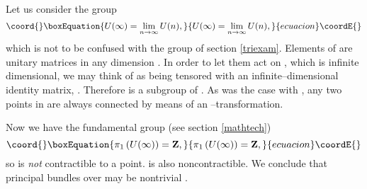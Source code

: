 \documentclass[a4paper,a4paper]{article}
\begin{document}
Let us consider the group \coordHE{} 
\begin{equation}\coord{}\boxEquation{
U(\infty)=\lim_{n\to\infty} U(n),
\label{uinfty}
}{
U(\infty)=\lim_{n\to\infty} U(n),
}{ecuacion}\coordE{}\end{equation}
which is not to be confused with the group \coordHE{} of section 
\ref{triexam}. Elements of \coordHE{} are \coordHE{} unitary matrices 
\coordHE{} in any dimension \coordHE{}. In order to let them act on \coordHE{}, 
which is infinite dimensional, we may think of \coordHE{} as being tensored with 
an infinite--dimensional identity matrix, \coordHE{}. 
Therefore  \coordHE{} is a subgroup of \coordHE{}. As was the case with
\coordHE{}, any two points in \coordHE{} are always connected by means 
of an \coordHE{}--transformation.

Now we have the fundamental group (see section \ref{mathtech})
\begin{equation}\coord{}\boxEquation{
\pi_1\left(U(\infty)\right)={\bf Z},
\label{homotop}
}{
\pi_1\left(U(\infty)\right)={\bf Z},
}{ecuacion}\coordE{}\end{equation}
so \coordHE{} is {\it not} contractible to a point. \coordHE{} is also noncontractible. 
We conclude that principal \coordHE{} bundles over \coordHE{} may be nontrivial 
\cite{STEENROD}. 
\end{document}
